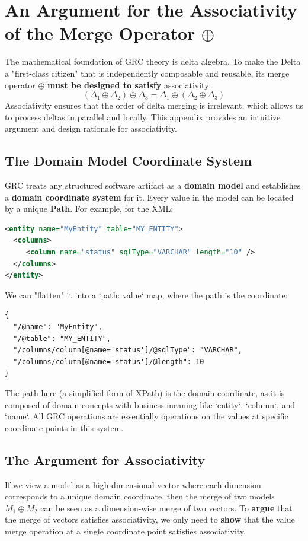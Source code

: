\documentclass[11pt]{article}
\begin{document}
\section{An Argument for the Associativity of the Merge Operator $\oplus$}

The mathematical foundation of GRC theory is delta algebra. To make the Delta a "first-class citizen" that is independently composable and reusable, its merge operator $\oplus$ \textbf{must be designed to satisfy} associativity:
\[
(\Delta_1 \oplus \Delta_2) \oplus \Delta_3 = \Delta_1 \oplus (\Delta_2 \oplus \Delta_3)
\]
Associativity ensures that the order of delta merging is irrelevant, which allows us to process deltas in parallel and locally. This appendix provides an intuitive argument and design rationale for associativity.

\subsection{The Domain Model Coordinate System}
GRC treats any structured software artifact as a \textbf{domain model} and establishes a \textbf{domain coordinate system} for it. Every value in the model can be located by a unique \textbf{Path}. For example, for the XML:
\begin{lstlisting}[language=XML, numbers=none]
<entity name="MyEntity" table="MY_ENTITY">
  <columns>
     <column name="status" sqlType="VARCHAR" length="10" />
  </columns>
</entity>
\end{lstlisting}
We can "flatten" it into a `{path: value}` map, where the path is the coordinate:
\begin{verbatim}
{
  "/@name": "MyEntity",
  "/@table": "MY_ENTITY",
  "/columns/column[@name='status']/@sqlType": "VARCHAR",
  "/columns/column[@name='status']/@length": 10
}
\end{verbatim}
The path here (a simplified form of XPath) is the domain coordinate, as it is composed of domain concepts with business meaning like `entity`, `column`, and `name`. All GRC operations are essentially operations on the values at specific coordinate points in this system.

\subsection{The Argument for Associativity}
If we view a model as a high-dimensional vector where each dimension corresponds to a unique domain coordinate, then the merge of two models $M_1 \oplus M_2$ can be seen as a dimension-wise merge of two vectors. To \textbf{argue} that the merge of vectors satisfies associativity, we only need to \textbf{show} that the value merge operation at a single coordinate point satisfies associativity.
\end{document}
